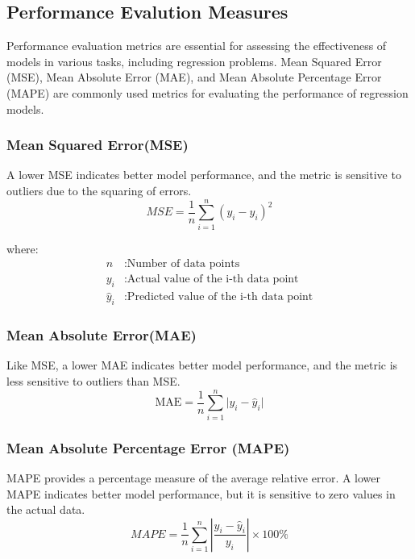 \documentclass{ws-ijait}
\begin{document}
\subsection{Performance Evalution Measures}
Performance evaluation metrics are essential for assessing the effectiveness of models in various tasks, including regression problems. Mean Squared Error (MSE), Mean Absolute Error (MAE), and Mean Absolute Percentage Error (MAPE) are commonly used metrics for evaluating the performance of regression models.

\subsubsection{Mean Squared Error(MSE)}
A lower MSE indicates better model performance, and the metric is sensitive to outliers due to the squaring of errors.
\begin{equation}
	MSE = \frac{1}{n} \sum_{i=1}^{n} (y_i - \hat{y}_i)^2
\end{equation}

where:
\begin{align*}
	n & : \text{Number of data points} \\
	y_i & : \text{Actual value of the i-th data point} \\
	\hat{y}_i & : \text{Predicted value of the i-th data point}
\end{align*}

\subsubsection{Mean Absolute Error(MAE)}
Like MSE, a lower MAE indicates better model performance, and the metric is less sensitive to outliers than MSE.
\begin{equation}
	\text{MAE} = \frac{1}{n} \sum_{i=1}^{n} \lvert y_i - \hat{y}_i \rvert
\end{equation}

\subsubsection{Mean Absolute Percentage Error (MAPE)}
MAPE provides a percentage measure of the average relative error. A lower MAPE indicates better model performance, but it is sensitive to zero values in the actual data.
\begin{equation}
	MAPE = \frac{1}{n} \sum_{i=1}^{n} \left| \frac{y_i - \hat{y}_i}{y_i} \right| \times 100\%
\end{equation}
\end{document}
